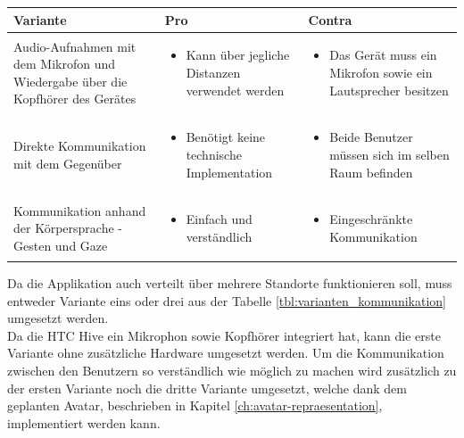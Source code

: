 \begin{center}
	\begin{tabularx} {\textwidth} { | B | B | B | }
		\hline
		\color{white} \textbf{Variante} & \color{white} \textbf{Pro} & 
		\color{white} \textbf{Contra} \\
		\hline
		\vspace{1pt}
		Audio-Aufnahmen mit dem Mikrofon und Wiedergabe über die Kopfhörer des Gerätes & 
		\begin{itemize} [leftmargin=*,noitemsep,topsep=0pt]
			\item Kann über jegliche Distanzen verwendet werden
		\end{itemize} & 
		\begin{itemize} [leftmargin=*,noitemsep,topsep=0pt]
			\item Das Gerät muss ein Mikrofon sowie ein Lautsprecher besitzen
		\end{itemize} \\
		\hline
		\vspace{1pt}
		Direkte Kommunikation mit dem Gegenüber & 
		\begin{itemize} [leftmargin=*,noitemsep,topsep=0pt]
			\item Benötigt keine technische Implementation
		\end{itemize} & 
		\begin{itemize} [leftmargin=*,noitemsep,topsep=0pt]
			\item Beide Benutzer müssen sich im selben Raum befinden
		\end{itemize} \\
		\hline
		\vspace{1pt}
		Kommunikation anhand der Körpersprache - Gesten und Gaze & 
		\begin{itemize} [leftmargin=*,noitemsep,topsep=0pt]
			\item Einfach und verständlich
		\end{itemize} & 
		\begin{itemize} [leftmargin=*,noitemsep,topsep=0pt]
			\item Eingeschränkte Kommunikation
		\end{itemize} \\
		\hline	
	\end{tabularx}
\end{center}
\label{tbl:varianten_kommunikation}

\bigskip
Da die Applikation auch verteilt über mehrere Standorte funktionieren soll, muss entweder Variante eins oder drei aus der Tabelle \ref{tbl:varianten_kommunikation} umgesetzt werden.  \\
Da die HTC Hive ein Mikrophon sowie Kopfhörer integriert hat, kann die erste Variante ohne zusätzliche Hardware umgesetzt werden. Um die Kommunikation zwischen den Benutzern so verständlich wie möglich zu machen wird zusätzlich zu der ersten Variante noch die dritte Variante umgesetzt, welche dank dem geplanten Avatar, beschrieben in Kapitel \ref{ch:avatar-repraesentation}, implementiert werden kann.


